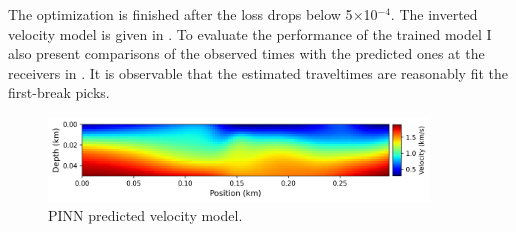The optimization is finished after the loss drops below 5$\times$10$^{-4}$. The inverted velocity model is given in . To evaluate the performance of the trained model I also present comparisons of the observed times with the predicted ones at the receivers in . It is observable that the estimated traveltimes are reasonably fit the first-break picks.

\begin{figure}
 \centering
 \includegraphics[width=0.9\textwidth]{figures/chap04_field_data/aqaba_pinn_tomo.png} 
 \caption{PINN predicted velocity model.}
 \label{fig:aqaba_pinn_tomo}
\end{figure}


